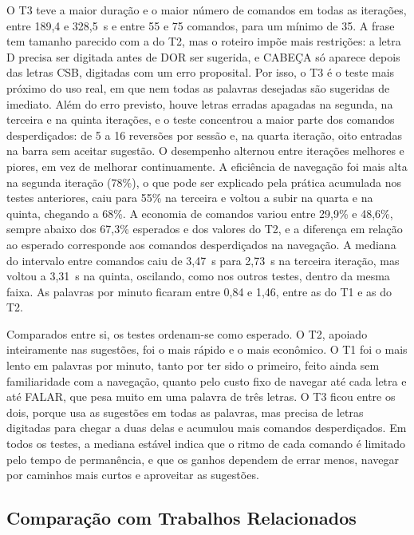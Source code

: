 O T3 teve a maior duração e o maior número de comandos em todas as iterações, entre 189,4 e 328,5~s e entre 55 e 75 comandos, para um mínimo de 35. A frase tem tamanho parecido com a do T2, mas o roteiro impõe mais restrições: a letra D precisa ser digitada antes de DOR ser sugerida, e CABEÇA só aparece depois das letras CSB, digitadas com um erro proposital. Por isso, o T3 é o teste mais próximo do uso real, em que nem todas as palavras desejadas são sugeridas de imediato. Além do erro previsto, houve letras erradas apagadas na segunda, na terceira e na quinta iterações, e o teste concentrou a maior parte dos comandos desperdiçados: de 5 a 16 reversões por sessão e, na quarta iteração, oito entradas na barra sem aceitar sugestão. O desempenho alternou entre iterações melhores e piores, em vez de melhorar continuamente. A eficiência de navegação foi mais alta na segunda iteração (78\%), o que pode ser explicado pela prática acumulada nos testes anteriores, caiu para 55\% na terceira e voltou a subir na quarta e na quinta, chegando a 68\%. A economia de comandos variou entre 29,9\% e 48,6\%, sempre abaixo dos 67,3\% esperados e dos valores do T2, e a diferença em relação ao esperado corresponde aos comandos desperdiçados na navegação. A mediana do intervalo entre comandos caiu de 3,47~s para 2,73~s na terceira iteração, mas voltou a 3,31~s na quinta, oscilando, como nos outros testes, dentro da mesma faixa. As palavras por minuto ficaram entre 0,84 e 1,46, entre as do T1 e as do T2.

Comparados entre si, os testes ordenam-se como esperado. O T2, apoiado inteiramente nas sugestões, foi o mais rápido e o mais econômico. O T1 foi o mais lento em palavras por minuto, tanto por ter sido o primeiro, feito ainda sem familiaridade com a navegação, quanto pelo custo fixo de navegar até cada letra e até FALAR, que pesa muito em uma palavra de três letras. O T3 ficou entre os dois, porque usa as sugestões em todas as palavras, mas precisa de letras digitadas para chegar a duas delas e acumulou mais comandos desperdiçados. Em todos os testes, a mediana estável indica que o ritmo de cada comando é limitado pelo tempo de permanência, e que os ganhos dependem de errar menos, navegar por caminhos mais curtos e aproveitar as sugestões.

    \subsection{Comparação com Trabalhos Relacionados}

